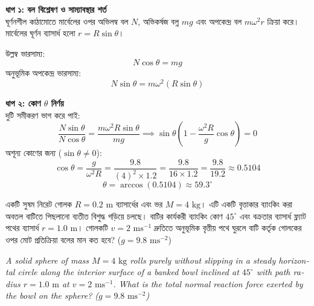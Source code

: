 \documentclass[12pt, a4paper]{article}
\begin{document}
{%
\begin{tcolorbox}[solutionbox={সমাধান (Solution)}]
\noindent
\textbf{ধাপ ১: বল বিশ্লেষণ ও সাম্যাবস্থার শর্ত} \\
ঘূর্ণনশীল কাঠামোতে মার্বেলের ওপর অভিলম্ব বল $N$, অভিকর্ষজ বল্ন $mg$ এবং অপকেন্দ্র বল $m \omega^2 r$ ক্রিয়া করে। মার্বেলের ঘূর্ণন ব্যাসার্ধ হলো $r = R \sin\theta$।

উল্লম্ব ভারসাম্য:
\[ N \cos\theta = m g \]
অনুভূমিক অপকেন্দ্র ভারসাম্য:
\[ N \sin\theta = m \omega^2 (R \sin\theta) \]

\vspace{0.5em}
\noindent
\textbf{ধাপ ২: কোণ $\theta$ নির্ণয়} \\
দুটি সমীকরণ ভাগ করে পাই:
\[ \frac{N \sin\theta}{N \cos\theta} = \frac{m \omega^2 R \sin\theta}{m g} \implies \sin\theta \left(1 - \frac{\omega^2 R}{g} \cos\theta\right) = 0 \]
অশূন্য কোণের জন্য ($\sin\theta \neq 0$):
\[ \cos\theta = \frac{g}{\omega^2 R} = \frac{9.8}{(4)^2 \times 1.2} = \frac{9.8}{16 \times 1.2} = \frac{9.8}{19.2} \approx 0.5104 \]
\[ \theta = \arccos(0.5104) \approx 59.3^\circ \]
\end{tcolorbox}


\begin{tcolorbox}[questionbox={প্রশ্ন (Question) 11}]
\noindent
একটি সুষম নিরেট গোলক $R = 0.2\text{ m}$ ব্যাসার্ধের এবং ভর $M = 4\text{ kg}$। এটি একটি বৃত্তাকার ব্যাংকিং করা অবতল বাটিতে পিছলানো ব্যতীত বিশুদ্ধ গড়িয়ে চলছে। বাটির কার্যকরী ব্যাংকিং কোণ $45^\circ$ এবং বক্রতার ব্যাসার্ধ ফ্ল্যাট পথের ব্যাসার্ধ $r = 1.0\text{ m}$। গোলকটি $v = 2\text{ ms}^{-1}$ দ্রুতিতে অনুভূমিক বৃত্তীয় পথে ঘুরলে বাটি কর্তৃক গোলকের ওপর মোট প্রতিক্রিয়া বলের মান কত হবে? ($g = 9.8\text{ ms}^{-2}$)

\vspace{0.8em}
\begin{english}
\noindent\textit{\color{darkgray}
A solid sphere of mass $M = 4\text{ kg}$ rolls purely without slipping in a steady horizontal circle along the interior surface of a banked bowl inclined at $45^\circ$ with path radius $r = 1.0\text{ m}$ at $v = 2\text{ ms}^{-1}$. What is the total normal reaction force exerted by the bowl on the sphere? ($g = 9.8\text{ ms}^{-2}$)
}
\end{english}
\end{tcolorbox}

}
\end{document}
